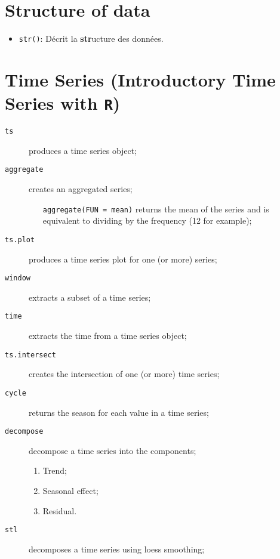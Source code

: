 \documentclass[10pt, french]{article}
\begin{document}
\begin{multicols*}{2}
\section*{Structure of data}
\begin{itemize}
	\item	\texttt{str()}: Décrit la \textbf{str}ucture des données.
\end{itemize}

\section*{Time Series (Introductory Time Series with \texttt{R})}
\begin{distributions}
\begin{description}
	\item[\texttt{ts}]	produces a time series object;
	\item[\texttt{aggregate}]	creates an aggregated series;
		\begin{itemize}
		\item[\texttt{aggregate(FUN = mean)}]	returns the mean of the series and is equivalent to dividing by the frequency (12 for example);
		\end{itemize}
	\item[\texttt{ts.plot}]	produces a time series plot for one (or more) series;
	\item[\texttt{window}]	extracts a subset of a time series;
	\item[\texttt{time}]	extracts the time from a time series object;
	\item[\texttt{ts.intersect}]	creates the intersection of one (or more) time series;
	\item[\texttt{cycle}]	returns the season for each value in a time series;
	\item[\texttt{decompose}]	decompose a time series into the components;
		\begin{enumerate}
		\item	Trend;
		\item	Seasonal effect;
		\item	Residual.
		\end{enumerate}
	\item[\texttt{stl}]	decomposes a time series using loess smoothing;
\end{description}
\end{distributions}
\end{multicols*}
\end{document}
